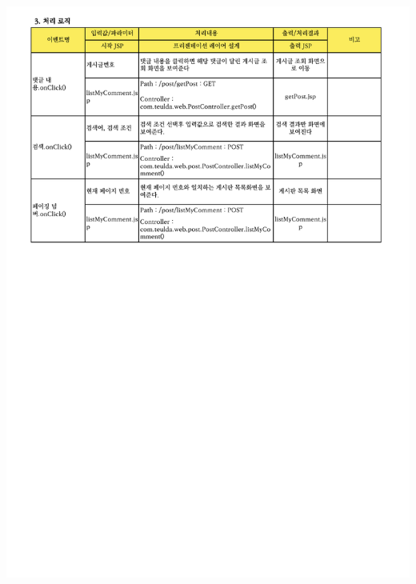 {{{{{{{{{{{{{{{{{{{{{{{{{{{{{{{{{{{{{{{{{{{{{{{{{{{{{{{{{{\includegraphics[width=20cm]{./Figure/Design/Display/post/post_06.pdf} \\
}}}}}}}}}}}}}}}}}}}}}}}}}}}}}}}}}}}}}}}}}}}}}}}}}}}}}}}}}}
